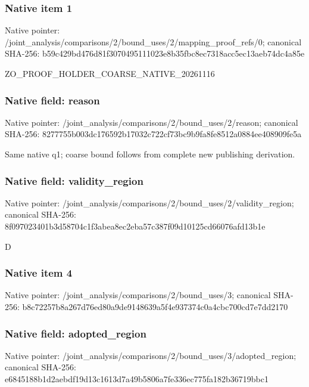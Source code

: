 \documentclass[10pt,a4paper]{article}
\begin{document}
\subsubsection{Native item 1}
Native pointer: /joint\_\allowbreak{}analysis/comparisons/2/bound\_\allowbreak{}uses/2/mapping\_\allowbreak{}proof\_\allowbreak{}refs/0; canonical SHA-256: b59c429bd476d81f3070495111023e8b35fbc8ec7318acc5ec13aeb74dc4a85e

\begingroup\raggedright\sloppy ZO\_\allowbreak{}PROOF\_\allowbreak{}HOLDER\_\allowbreak{}COARSE\_\allowbreak{}NATIVE\_\allowbreak{}20261116\par\endgroup

\subsubsection{Native field: reason}
Native pointer: /joint\_\allowbreak{}analysis/comparisons/2/bound\_\allowbreak{}uses/2/reason; canonical SHA-256: 8277755b003dc176592b17032c722cf73bc9b9fa8fe8512a0884ee408909fe5a

\begingroup\raggedright\sloppy Same native q1;\allowbreak{} coarse bound follows from complete new publishing derivation.\par\endgroup

\subsubsection{Native field: validity\_\allowbreak{}region}
Native pointer: /joint\_\allowbreak{}analysis/comparisons/2/bound\_\allowbreak{}uses/2/validity\_\allowbreak{}region; canonical SHA-256: 8f097023401b3d58704c1f3abea8ec2eba57c387f09d10125cd66076afd13b1e

\begingroup\raggedright\sloppy D\par\endgroup

\subsubsection{Native item 4}
Native pointer: /joint\_\allowbreak{}analysis/comparisons/2/bound\_\allowbreak{}uses/3; canonical SHA-256: b8c72257b8a267d76ed80a9de9148639a5f4e937374c0a4cbc700cd7e7dd2170

\subsubsection{Native field: adopted\_\allowbreak{}region}
Native pointer: /joint\_\allowbreak{}analysis/comparisons/2/bound\_\allowbreak{}uses/3/adopted\_\allowbreak{}region; canonical SHA-256: e6845188b1d2aebdf19d13c1613d7a49b5806a7fe336ec775fa182b36719bbc1
\end{document}
